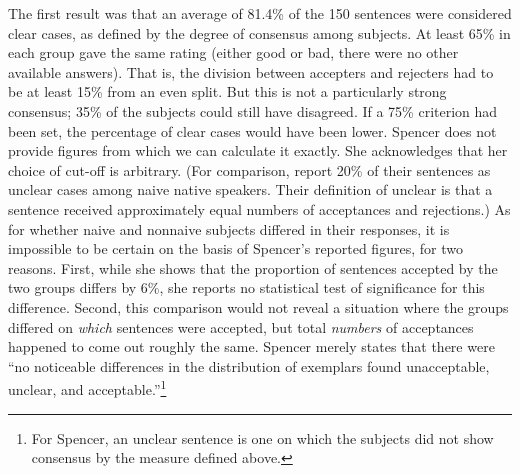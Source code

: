 The first result was that an average of 81.4\% of the 150 sentences were considered  clear cases, as defined by the degree of consensus  among  subjects. At
least 65\% in each group gave the same rating (either good or bad, there were no other available answers). That is, the division between accepters and rejecters had to be at least 15\% from an even split. But this is not a particularly strong consensus; 35\% of the subjects could still have disagreed. If a 75\% criterion had been set, the percentage of clear cases would have been lower. Spencer does not provide figures from which we can calculate it exactly. She acknowledges that her choice of cut-off is arbitrary. (For comparison, \citet{SnowEtAl1977} report 20\% of their sentences as unclear cases among naive native speakers. Their definition of unclear is that a sentence received approximately equal numbers of acceptances and rejections.) As for whether naive and nonnaive subjects differed in their responses, it is impossible to be certain on the basis of Spencer's reported figures, for two reasons. First, while she shows that the proportion of sentences accepted by the two groups differs by 6\%, she reports no statistical test of significance for this difference. Second, this comparison would not reveal a situation where the groups differed on \textit{which} sentences were accepted, but total \textit{numbers} of acceptances happened to come out roughly the same. Spencer merely states that there were ``no noticeable differences in the distribution of exemplars found unacceptable, unclear, and acceptable.''\footnote{For Spencer, an unclear sentence is one on which the subjects did not show consensus by the measure defined above.}


